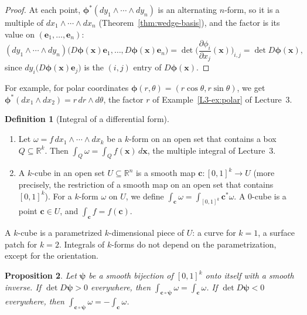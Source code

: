 \documentclass[11pt]{article}
\theoremstyle{definition}
\newtheorem{definition}{Definition}[section]
\theoremstyle{plain}
\newtheorem{proposition}[definition]{Proposition}
\theoremstyle{remark}
\begin{document}
\begin{proof}
    At each point, $\boldsymbol{\phi}^*(dy_1 \wedge \cdots \wedge dy_n)$ is an alternating $n$-form, so it is a multiple of $dx_1 \wedge \cdots \wedge dx_n$ (Theorem~\ref{thm:wedge-basis}), and the factor is its value on $(\mathbf{e}_1, \ldots, \mathbf{e}_n)$:
    \[(dy_1 \wedge \cdots \wedge dy_n)\big(D\boldsymbol{\phi}(\mathbf{x})\mathbf{e}_1, \ldots, D\boldsymbol{\phi}(\mathbf{x})\mathbf{e}_n\big) = \det\Big(\frac{\partial \phi_i}{\partial x_j}(\mathbf{x})\Big)_{i,j} = \det D\boldsymbol{\phi}(\mathbf{x}),\]
    since $dy_i\big(D\boldsymbol{\phi}(\mathbf{x})\mathbf{e}_j\big)$ is the $(i, j)$ entry of $D\boldsymbol{\phi}(\mathbf{x})$.
\end{proof}

For example, for polar coordinates $\boldsymbol{\phi}(r, \theta) = (r\cos\theta, r\sin\theta)$, we get $\boldsymbol{\phi}^*(dx_1 \wedge dx_2) = r\, dr \wedge d\theta$, the factor $r$ of Example~\ref{L3-ex:polar} of Lecture~3.

\begin{definition}[Integral of a differential form]\label{def:form-integral}
    \begin{enumerate}
        \item Let $\omega = f\, dx_1 \wedge \cdots \wedge dx_k$ be a $k$-form on an open set that contains a box $Q \subseteq \mathbb{R}^k$. Then $\int_Q \omega = \int_Q f(\mathbf{x})\, d\mathbf{x}$, the multiple integral of Lecture~3.
        \item A $k$-cube in an open set $U \subseteq \mathbb{R}^n$ is a smooth map $\mathbf{c}: [0, 1]^k \to U$ (more precisely, the restriction of a smooth map on an open set that contains $[0, 1]^k$). For a $k$-form $\omega$ on $U$, we define $\int_{\mathbf{c}} \omega = \int_{[0,1]^k} \mathbf{c}^*\omega$. A $0$-cube is a point $\mathbf{c} \in U$, and $\int_{\mathbf{c}} f = f(\mathbf{c})$.
    \end{enumerate}
\end{definition}

A $k$-cube is a parametrized $k$-dimensional piece of $U$: a curve for $k = 1$, a surface patch for $k = 2$. Integrals of $k$-forms do not depend on the parametrization, except for the orientation.

\begin{proposition}\label{prop:reparametrization}
    Let $\boldsymbol{\psi}$ be a smooth bijection of $[0, 1]^k$ onto itself with a smooth inverse. If $\det D\boldsymbol{\psi} > 0$ everywhere, then $\int_{\mathbf{c} \circ \boldsymbol{\psi}} \omega = \int_{\mathbf{c}} \omega$. If $\det D\boldsymbol{\psi} < 0$ everywhere, then $\int_{\mathbf{c} \circ \boldsymbol{\psi}} \omega = -\int_{\mathbf{c}} \omega$.
\end{proposition}
\end{document}
